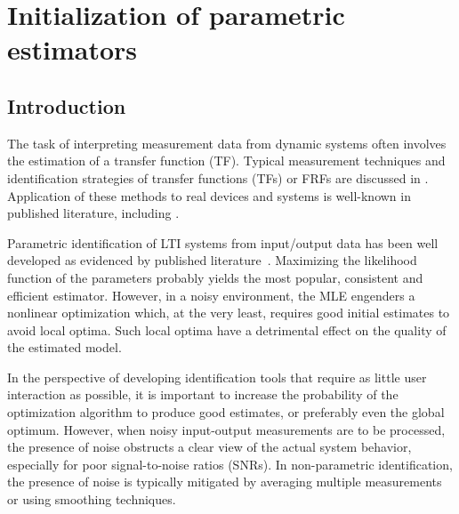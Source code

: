 \chapter{Initialization of parametric estimators}
\label{sec:initvals}
\gdef\thisDir{ch05-initvals}


\section{Introduction}\label{se:introd}

The task of interpreting measurement data from dynamic systems often involves the estimation of a transfer function (TF). 
Typical measurement techniques and identification strategies of transfer functions (TFs) or \glspl{FRF} are discussed in \citep{Schoukens1998,Schoukens2006LPM,Guillaume1996,Broersen1995,Pintelon2010LPM1,Antoni2007FRF}.
Application of these methods to real devices and systems is well-known in published literature, including \citep{Lim2010,Robinson1990,Behjat2010}.

Parametric identification of \gls{LTI} systems from input/output data has been well developed as evidenced by published literature~\citep{Pintelon2012,Ljung1999,Schoukens1999,Pintelon1998}. 
 Maximizing the likelihood function of the parameters probably yields the most popular, consistent and efficient estimator. 
 However, in a noisy environment, the \gls{MLE} engenders a nonlinear optimization which, at the very least, requires good initial estimates to avoid local optima.
 Such local optima have a detrimental effect on the quality of the estimated model.

 In the perspective of developing identification tools that require as little user interaction as possible, it is important to increase the probability of the optimization algorithm to produce good estimates, or preferably even the global optimum.
 However, when noisy input-output measurements are to be processed, the presence of noise obstructs a clear view of the actual system behavior, especially for poor signal-to-noise ratios (SNRs).
 In non-parametric identification, the presence of noise is typically mitigated by averaging multiple measurements or using smoothing techniques.

